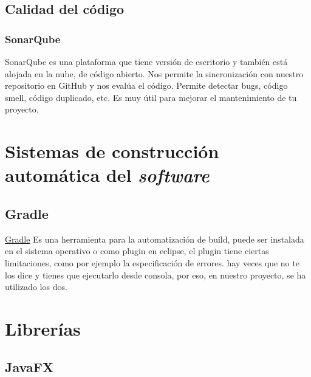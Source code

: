 
\subsection{Calidad del código}\label{calidad-del-codigo}

\subsubsection{SonarQube}\label{sonarqube}

SonarQube es una plataforma que tiene versión de escritorio y también está alojada en la nube, de código abierto. Nos permite la sincronización con nuestro repositorio en GitHub y nos evalúa el código. Permite detectar bugs, código smell, código duplicado, etc. Es muy útil para mejorar el mantenimiento de tu proyecto. \cite{web:sonarqube}

\section{Sistemas de construcción automática del
	\emph{software}}\label{sistemas-de-construccion-automuxe1tica-del-software}



\subsection{Gradle}\label{gradle}
\href{https://gradle.org/}{Gradle} Es una herramienta para la automatización de build, puede ser instalada en el sistema operativo o como plugin en eclipse, el plugin tiene ciertas limitaciones, como por ejemplo la especificación de errores. hay veces que no te los dice y tienes que ejecutarlo desde consola, por eso, en nuestro proyecto, se ha utilizado los dos. \cite{gradle}


\section{Librerías}\label{libreruxedas}


\subsection{JavaFX}\label{javafx}

